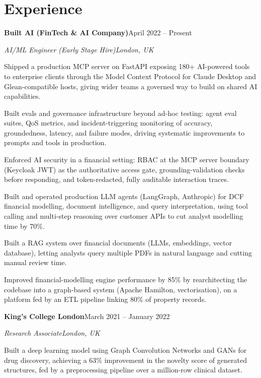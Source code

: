 \documentclass[10pt,a4paper]{article}
\newcommand{\entry}[4]{%
  {\color{company}\bfseries #1}\hfill {\color{muted}#2}\par
  \vspace{1pt}
  {\itshape #3}\hfill {\color{muted}\itshape #4}\par
  \vspace{3pt}%
}
\begin{document}
\section{Experience}
\entry{Built AI (FinTech \& AI Company)}{April 2022 -- Present}{AI/ML Engineer (Early Stage Hire)}{London, UK}
\begin{tight}
  \item Shipped a production MCP server on FastAPI exposing 180+ AI-powered tools to enterprise clients through the Model Context Protocol for Claude Desktop and Glean-compatible hosts, giving wider teams a governed way to build on shared AI capabilities.
  \item Built evals and governance infrastructure beyond ad-hoc testing: agent eval suites, QoS metrics, and incident-triggering monitoring of accuracy, groundedness, latency, and failure modes, driving systematic improvements to prompts and tools in production.
  \item Enforced AI security in a financial setting: RBAC at the MCP server boundary (Keycloak JWT) as the authoritative access gate, grounding-validation checks before responding, and token-redacted, fully auditable interaction traces.
  \item Built and operated production LLM agents (LangGraph, Anthropic) for DCF financial modelling, document intelligence, and query interpretation, using tool calling and multi-step reasoning over customer APIs to cut analyst modelling time by 70\%.
  \item Built a RAG system over financial documents (LLMs, embeddings, vector database), letting analysts query multiple PDFs in natural language and cutting manual review time.
  \item Improved financial-modelling engine performance by 85\% by rearchitecting the codebase into a graph-based system (Apache Hamilton, vectorisation), on a platform fed by an ETL pipeline linking 80\% of property records.
\end{tight}

\entry{King's College London}{March 2021 -- January 2022}{Research Associate}{London, UK}
\begin{tight}
  \item Built a deep learning model using Graph Convolution Networks and GANs for drug discovery, achieving a 63\% improvement in the novelty score of generated structures, fed by a preprocessing pipeline over a million-row clinical dataset.
\end{tight}
\end{document}
